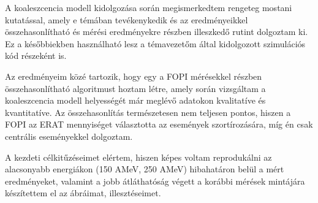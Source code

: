 \documentclass[a4paper,12pt]{article}
\begin{document}
\par A koaleszcencia modell kidolgozása során megismerkedtem rengeteg mostani kutatással, amely e témában tevékenykedik és az eredményeikkel összehasonlítható és mérési eredményekre részben illeszkedő rutint dolgoztam ki. Ez a későbbiekben használható lesz a témavezetőm által kidolgozott szimulációs kód részeként is.
\vspace{2mm} 
\par Az eredményeim közé tartozik, hogy egy a FOPI mérésekkel részben összehasonlítható algoritmust hoztam létre, amely során vizsgáltam a koaleszcencia modell helyességét már meglévő adatokon kvalitatíve és kvantitatíve. Az összehasonlítás természetesen nem teljesen pontos, hiszen a FOPI az ERAT mennyiséget választotta az események szortírozására, míg én csak centrális eseményekkel dolgoztam.
\vspace{2mm}
\par A kezdeti célkitűzéseimet elértem, hiszen képes voltam reprodukálni az alacsonyabb energiákon (150 AMeV, 250 AMeV) hibahatáron belül a mért eredményeket, valamint a jobb átláthatóság végett a korábbi mérések mintájára készítettem el az ábráimat, illesztéseimet.

\newpage




\end{document}
